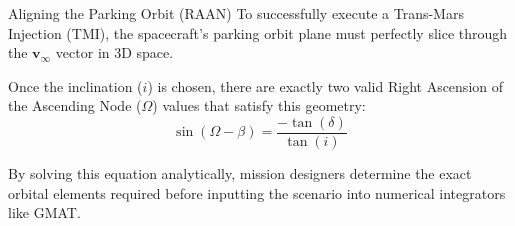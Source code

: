 \documentclass[11pt, aspectratio=169]{beamer}
\begin{document}
\begin{frame}{Aligning the Parking Orbit (RAAN)}
    To successfully execute a Trans-Mars Injection (TMI), the spacecraft's parking orbit plane must perfectly slice through the $\boldsymbol{v}_\infty$ vector in 3D space. 
    
    \vspace{0.4cm}
    Once the inclination ($i$) is chosen, there are exactly two valid Right Ascension of the Ascending Node ($\Omega$) values that satisfy this geometry:
    \begin{equation}
        \sin(\Omega - \beta) = \frac{-\tan(\delta)}{\tan(i)}
    \end{equation}
    
    \vspace{0.4cm}
    By solving this equation analytically, mission designers determine the exact orbital elements required before inputting the scenario into numerical integrators like GMAT.
\end{frame}
\end{document}
